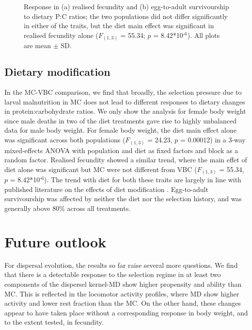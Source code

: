 \documentclass[12pt,onecolumn,twoside]{article}
\begin{document}
	\begin{figure}
		\centering
		\begin{subfigure}{\textwidth}
			\scalebox{0.35}{}
			\subcaption{\empty}
		\end{subfigure}
		\begin{subfigure}{\textwidth}
			\scalebox{0.35}{}
			\subcaption{\empty}
		\end{subfigure}
		\caption{\label{fig4} Response in (a) realised fecundity and (b) egg-to-adult survivourship to dietary P:C ratios; the two populations did not differ significantly in either of the traits, but the diet main effect was significant in realised fecundity alone ($F_{(1, 3)}$ = 55.34; $p$ = 8.42*10$^{\text{-6}}$). All plots are mean $\pm$ SD.}
	\end{figure}

	\subsection{Dietary modification}

	In the MC-VBC comparison, we find that broadly, the selection pressure due to larval malnutrition in MC does not lead to different responses to dietary changes in protein:carbohydrate ratios.
	We only show the analysis for female body weight since male deaths in two of the diet treatments gave rise to highly unbalanced data for male body weight. For female body weight, the diet main effect alone was significant across both populations ($F_{(1, 3)}$ = 24.23, $p$ = 0.00012) in a 3-way mixed-effects ANOVA with population and diet as fixed factors and block as a random factor. Realised fecundity showed a similar trend, where the main effet of diet alone was significant but MC were not different from VBC ($F_{(1, 3)}$ = 55.34, $p$ = 8.42*10$^{\text{-6}}$). The trend with diet for both these traits are largely in line with published literature on the effects of diet modification \citep{Lee2008}. Egg-to-adult survivourship was affected by neither the diet nor the selection history, and was generally above 80\% across all treatments.

	\section{Future outlook}
	For dispersal evolution, the results so far raise several more questions. We find that there is a detectable response to the selection regime in at least two components of the dispersel kernel-MD show higher propensity and ability than MC. This is reflected in the locomotor activity profiles, where MD show higher activity and lower rest fraction than the MC. On the other hand, these changes appear to have taken place without a corresponding response in body weight, and to the extent tested, in fecundity.
\end{document}
